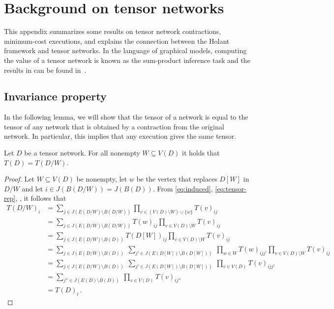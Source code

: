 %

\appendix


\section{Background on tensor networks}

\label{sect:exec}

This appendix summarizes some results on tensor network contractions, minimum-cost executions, and explains the connection between the Holant framework and tensor networks.   In the language of graphical models, computing the value of a tensor network is known as the sum-product inference task and the results in   can be found in~\cite[Part II]{KollerF2009}.

\subsection{Invariance property} \label{sec:invariance_property}

In the following lemma, we will show that the tensor of a network is equal to the tensor of any network that is obtained by a contraction from the original network. In particular, this implies that any execution gives the same tensor.

\begin{lemma}[Invariance]
\label{lem:invariance}
Let $D$ be a tensor network. For all nonempty $W\subseteq V(D)$ it holds that $T(D)=T(D/W)$.
\end{lemma}
\begin{proof}
Let $W\subseteq V(D)$ be nonempty, let $w$ be the vertex that replaces $D[W]$ in  $D/W$ and let $i\in J(B(D/W))=J(B(D))$.
From \eqref{eq:induced}, \eqref{eq:tensor-rep}, ,
it follows that
\[
\begin{split}
T(D/W)_i
&=
\sum_{j\in J(E(D/W)\setminus B(D/W))}
\prod_{v\in (V(D)\setminus W) \cup \{w\}}T(v)_{ij}\\
&=
\sum_{j\in J(E(D/W)\setminus B(D/W))}
T(w)_{ij}\prod_{v\in V(D)\setminus W}T(v)_{ij}\\
&=
\sum_{j\in J(E(D/W)\setminus B(D))}
T(D[W])_{ij}\prod_{v\in V(D)\setminus W}T(v)_{ij}\\
&=
\sum_{j\in J(E(D/W)\setminus B(D))}\
\sum_{j'\in J(E(D[W])\setminus B(D[W]))}\
\prod_{w\in W}T(w)_{ijj'}
\prod_{v\in V(D)\setminus W}T(v)_{ij}\\
&=
\sum_{j\in J(E(D/W)\setminus B(D))}\
\sum_{j'\in J(E(D[W])\setminus B(D[W]))}\
\prod_{v\in V(D)}T(v)_{ijj'}\\
&=
\sum_{j''\in J(E(D)\setminus B(D))}\
\prod_{v\in V(D)}T(v)_{ij''}\\
&=T(D)_i\,.
\end{split}
\]
\end{proof}


